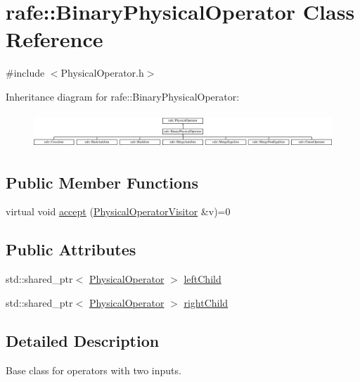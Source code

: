 \hypertarget{classrafe_1_1_binary_physical_operator}{\section{rafe\+:\+:Binary\+Physical\+Operator Class Reference}
\label{classrafe_1_1_binary_physical_operator}
}


{\ttfamily \#include $<$Physical\+Operator.\+h$>$}

Inheritance diagram for rafe\+:\+:Binary\+Physical\+Operator\+:\begin{figure}[H]
\begin{center}
\leavevmode
\includegraphics[height=1.297297cm]{classrafe_1_1_binary_physical_operator}
\end{center}
\end{figure}
\subsection*{Public Member Functions}
\begin{DoxyCompactItemize}
\item 
virtual void \hyperlink{classrafe_1_1_binary_physical_operator_a58ce0a14b970b2c932254419877a2e0e}{accept} (\hyperlink{classrafe_1_1_physical_operator_visitor}{Physical\+Operator\+Visitor} \&v)=0
\end{DoxyCompactItemize}
\subsection*{Public Attributes}
\begin{DoxyCompactItemize}
\item 
std\+::shared\+\_\+ptr$<$ \hyperlink{classrafe_1_1_physical_operator}{Physical\+Operator} $>$ \hyperlink{classrafe_1_1_binary_physical_operator_a3ca06613d63ed240f6306f0fb36a5d26}{left\+Child}
\item 
std\+::shared\+\_\+ptr$<$ \hyperlink{classrafe_1_1_physical_operator}{Physical\+Operator} $>$ \hyperlink{classrafe_1_1_binary_physical_operator_a0c90c9b14fd1e543cf721cdb54f658fd}{right\+Child}
\end{DoxyCompactItemize}


\subsection{Detailed Description}
Base class for operators with two inputs. 

